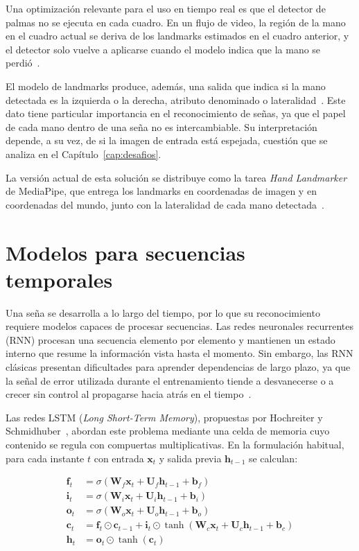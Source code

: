 Una optimización relevante para el uso en tiempo real es que el detector de palmas no se ejecuta en cada cuadro. En un flujo de video, la región de la mano en el cuadro actual se deriva de los landmarks estimados en el cuadro anterior, y el detector solo vuelve a aplicarse cuando el modelo indica que la mano se perdió~\cite{zhang2020mediapipehands}.

El modelo de landmarks produce, además, una salida que indica si la mano detectada es la izquierda o la derecha, atributo denominado  o lateralidad~\cite{zhang2020mediapipehands}. Este dato tiene particular importancia en el reconocimiento de señas, ya que el papel de cada mano dentro de una seña no es intercambiable. Su interpretación depende, a su vez, de si la imagen de entrada está espejada, cuestión que se analiza en el Capítulo~\ref{cap:desafios}.

La versión actual de esta solución se distribuye como la tarea \emph{Hand Landmarker} de MediaPipe, que entrega los landmarks en coordenadas de imagen y en coordenadas del mundo, junto con la lateralidad de cada mano detectada~\cite{mediapipeHands}.

\section{Modelos para secuencias temporales}

Una seña se desarrolla a lo largo del tiempo, por lo que su reconocimiento requiere modelos capaces de procesar secuencias. Las redes neuronales recurrentes (RNN) procesan una secuencia elemento por elemento y mantienen un estado interno que resume la información vista hasta el momento. Sin embargo, las RNN clásicas presentan dificultades para aprender dependencias de largo plazo, ya que la señal de error utilizada durante el entrenamiento tiende a desvanecerse o a crecer sin control al propagarse hacia atrás en el tiempo~\cite{hochreiter1997lstm}.

Las redes LSTM (\emph{Long Short-Term Memory}), propuestas por Hochreiter y Schmidhuber~\cite{hochreiter1997lstm}, abordan este problema mediante una celda de memoria cuyo contenido se regula con compuertas multiplicativas. En la formulación habitual, para cada instante $t$ con entrada $\mathbf{x}_t$ y salida previa $\mathbf{h}_{t-1}$ se calculan:

\begin{align}
    \mathbf{f}_t &= \sigma(\mathbf{W}_f \mathbf{x}_t + \mathbf{U}_f \mathbf{h}_{t-1} + \mathbf{b}_f) \\
    \mathbf{i}_t &= \sigma(\mathbf{W}_i \mathbf{x}_t + \mathbf{U}_i \mathbf{h}_{t-1} + \mathbf{b}_i) \\
    \mathbf{o}_t &= \sigma(\mathbf{W}_o \mathbf{x}_t + \mathbf{U}_o \mathbf{h}_{t-1} + \mathbf{b}_o) \\
    \mathbf{c}_t &= \mathbf{f}_t \odot \mathbf{c}_{t-1} + \mathbf{i}_t \odot \tanh(\mathbf{W}_c \mathbf{x}_t + \mathbf{U}_c \mathbf{h}_{t-1} + \mathbf{b}_c) \\
    \mathbf{h}_t &= \mathbf{o}_t \odot \tanh(\mathbf{c}_t)
\end{align}


